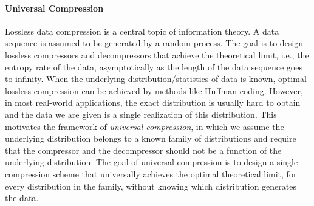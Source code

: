 \documentclass[11pt]{article}
\newcommand{\ziao}[1]{\textcolor{magenta}{ (Ziao:#1)}}
\begin{document}
\paragraph{Universal Compression}
Lossless data compression is a central topic of information theory. A data sequence is assumed to be generated by a random process. The goal is to design lossless compressors and decompressors that achieve the theoretical limit, i.e., the entropy rate of the data, asymptotically as the length of the data sequence goes to infinity. When the underlying distribution/statistics of data is known, optimal lossless compression can be achieved by methods like Huffman coding. However, in most real-world applications, the exact distribution is usually hard to obtain and the data we are given is a single realization of this distribution. This motivates the framework of \emph{universal compression}, in which we assume the underlying distribution belongs to a known family of distributions and require that the compressor and the decompressor should not be a function of the underlying distribution. The goal of universal compression is to design a single compression scheme that universally achieves the optimal theoretical limit, for every distribution in the family, without knowing which distribution generates the data.
\end{document}
